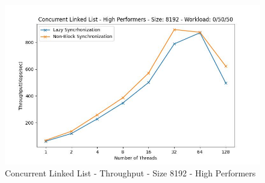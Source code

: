 \documentclass[../final_report.tex]{subfiles}
\begin{document}
\begin{figure}[H]
        \includegraphics[scale=0.4]{outFiles/plots/concurrent_data_structs_high_8192_0_50_50.jpg}
    \caption{Concurrent Linked List - Throughput - Size 8192 - High Performers}
    \label{fig:Concurrent Linked List - Throughput - Size 8192 - High Performers}
\end{figure}
\end{document}
